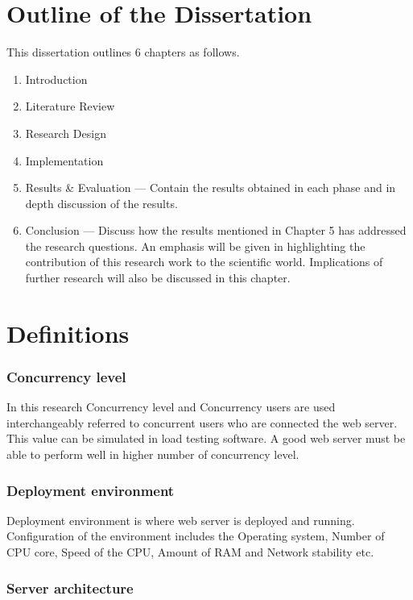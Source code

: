 \section{Outline of the Dissertation}

This dissertation outlines 6 chapters as follows.

\begin{enumerate}
	\item Introduction
	\item Literature Review 
	\item Research Design
	\item Implementation
	\item Results \& Evaluation — Contain the results obtained in each phase and in depth discussion of the results.
	\item Conclusion — Discuss how the results mentioned in Chapter 5 has addressed the research questions. An emphasis will be given in highlighting the contribution of this research work to the scientific world. Implications of further research will also be discussed in this chapter.
\end{enumerate}

\section{Definitions}

\subsubsection{Concurrency level}

In this research Concurrency level and Concurrency users are used interchangeably referred to concurrent users who are connected the web server. This value can be  simulated in load testing software. A good web server must be able to perform well in higher number of concurrency level.

\subsubsection{Deployment environment}

Deployment environment is where web server is deployed and running. Configuration of the environment includes the Operating system, Number of CPU core, Speed of the CPU, Amount of RAM and Network stability etc.

\subsubsection{Server architecture}

